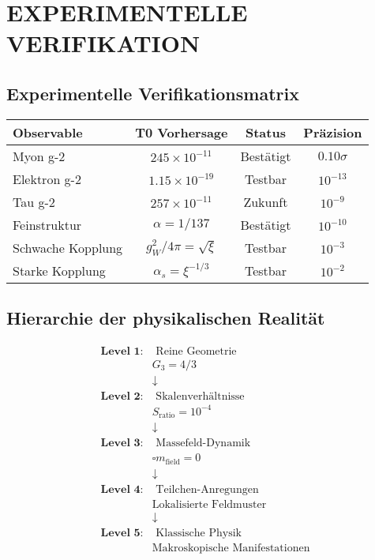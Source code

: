 \documentclass[12pt,a4paper]{article}
\begin{document}
	\section{EXPERIMENTELLE VERIFIKATION}
	
	\subsection{Experimentelle Verifikationsmatrix}
	
	\begin{center}
		\begin{tabular}{|l|c|c|c|}
			\hline
			\textbf{Observable} & \textbf{T0 Vorhersage} & \textbf{Status} & \textbf{Präzision} \\
			\hline
			Myon g-2 & $245 \times 10^{-11}$ & Bestätigt & $0.10\sigma$ \\
			Elektron g-2 & $1.15 \times 10^{-19}$ & Testbar & $10^{-13}$ \\
			Tau g-2 & $257 \times 10^{-11}$ & Zukunft & $10^{-9}$ \\
			Feinstruktur & $\alpha = 1/137$ & Bestätigt & $10^{-10}$ \\
			Schwache Kopplung & $g_W^2/4\pi = \sqrt{\xi}$ & Testbar & $10^{-3}$ \\
			Starke Kopplung & $\alpha_s = \xi^{-1/3}$ & Testbar & $10^{-2}$ \\
			\hline
		\end{tabular}
	\end{center}
	
	\subsection{Hierarchie der physikalischen Realität}
	
	\begin{align}
		\textbf{Level 1:} &\text{ Reine Geometrie} \nonumber \\
		&G_3 = 4/3 \nonumber \\
		&\downarrow \nonumber \\
		\textbf{Level 2:} &\text{ Skalenverhältnisse} \nonumber \\
		&S_{\text{ratio}} = 10^{-4} \nonumber \\
		&\downarrow \nonumber \\
		\textbf{Level 3:} &\text{ Massefeld-Dynamik} \nonumber \\
		&\square m_{\text{field}} = 0 \nonumber \\
		&\downarrow \nonumber \\
		\textbf{Level 4:} &\text{ Teilchen-Anregungen} \nonumber \\
		&\text{Lokalisierte Feldmuster} \nonumber \\
		&\downarrow \nonumber \\
		\textbf{Level 5:} &\text{ Klassische Physik} \nonumber \\
		&\text{Makroskopische Manifestationen} \nonumber
	\end{align}
	
\end{document}
